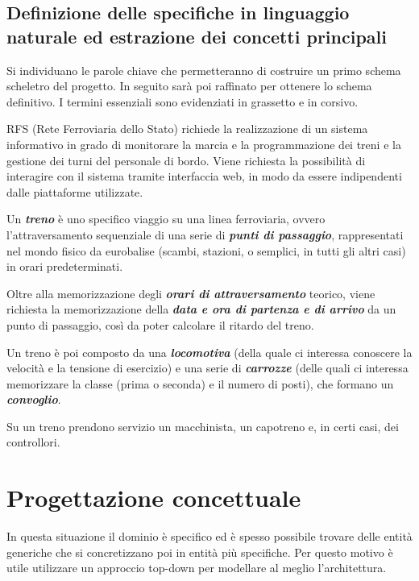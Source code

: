 \documentclass[a4paper,12pt]{report}
\begin{document}
	\section{Definizione delle specifiche in linguaggio naturale ed estrazione dei concetti principali}
	\par Si individuano le parole chiave che permetteranno di costruire un primo schema scheletro del progetto. In seguito sarà poi raffinato per ottenere lo schema definitivo. I termini essenziali sono evidenziati in grassetto e in corsivo.
	\par RFS (Rete Ferroviaria dello Stato) richiede la realizzazione di un sistema informativo in grado di monitorare la marcia e la programmazione dei treni e la gestione dei turni del personale di bordo. Viene richiesta la possibilità di interagire con il sistema tramite interfaccia web, in modo da essere indipendenti dalle piattaforme utilizzate.
	\par Un \textbf{\textit{treno}} è uno specifico viaggio su una linea ferroviaria, ovvero l'attraversamento sequenziale di una serie di \textbf{\textit{punti di passaggio}}, rappresentati nel mondo fisico da eurobalise (scambi, stazioni, o semplici, in tutti gli altri casi) in orari predeterminati.
	\par Oltre alla memorizzazione degli \textbf{\textit{orari di attraversamento}} teorico, viene richiesta la memorizzazione della \textbf{\textit{data e ora di partenza e di arrivo}} da un punto di passaggio, così da poter calcolare il ritardo del treno.
	\par Un treno è poi composto da una \textbf{\textit{locomotiva}} (della quale ci interessa conoscere la velocità e la tensione di esercizio) e una serie di \textbf{\textit{carrozze}} (delle quali ci interessa memorizzare la classe (prima o seconda) e il numero di posti), che formano un \textbf{\textit{convoglio}}.
	\par Su un treno prendono servizio un macchinista, un capotreno e, in certi casi, dei controllori.
	\chapter{Progettazione concettuale}
	\par In questa situazione il dominio è specifico ed è spesso possibile trovare delle entità generiche che si concretizzano poi in entità più specifiche. Per questo motivo è utile utilizzare un approccio top-down per modellare al meglio l'architettura.
\end{document}
